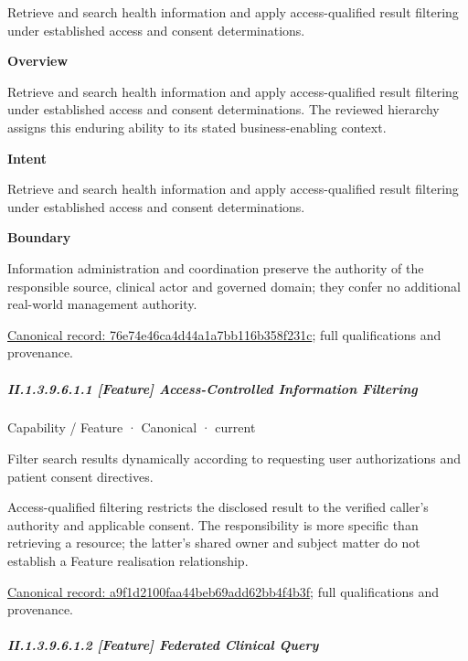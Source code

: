 Retrieve and search health information and apply access-qualified result filtering under established access and consent determinations.



\textbf{Overview}



Retrieve and search health information and apply access-qualified result filtering under established access and consent determinations. The reviewed hierarchy assigns this enduring ability to its stated business-enabling context.



\textbf{Intent}



Retrieve and search health information and apply access-qualified result filtering under established access and consent determinations.



\textbf{Boundary}



Information administration and coordination preserve the authority of the responsible source, clinical actor and governed domain; they confer no additional real-world management authority.


{\footnotesize \href{../../../../continuum/strategy/capability/76e74e46ca4d44a1a7bb116b358f231c.md}{Canonical record: 76e74e46ca4d44a1a7bb116b358f231c}; full qualifications and provenance.}\par
\subparagraph*{II.1.3.9.6.1.1 [Feature] Access-Controlled Information Filtering}
\label{navigation:II.1.3.9.6.1.1}

\label{element:a9f1d2100faa44beb69add62bb4f4b3f}
{\small Capability / Feature · Canonical · current}\par

Filter search results dynamically according to requesting user authorizations and patient consent directives.



Access-qualified filtering restricts the disclosed result to the verified caller's authority and applicable consent. The responsibility is more specific than retrieving a resource; the latter's shared owner and subject matter do not establish a Feature realisation relationship.


{\footnotesize \href{../../../../continuum/strategy/capability/feature/a9f1d2100faa44beb69add62bb4f4b3f.md}{Canonical record: a9f1d2100faa44beb69add62bb4f4b3f}; full qualifications and provenance.}\par
\subparagraph*{II.1.3.9.6.1.2 [Feature] Federated Clinical Query}
\label{navigation:II.1.3.9.6.1.2}

